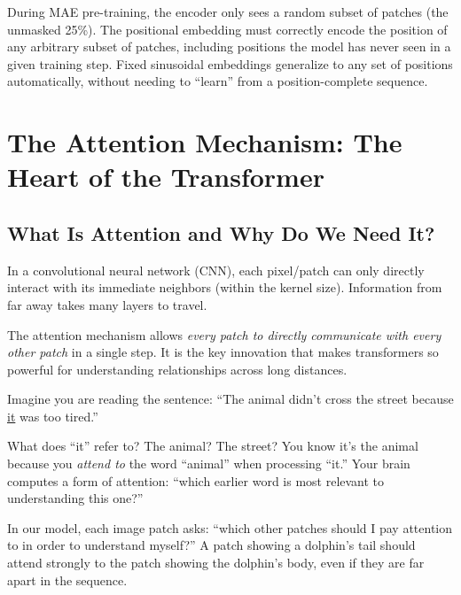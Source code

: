 \documentclass[12pt, a4paper]{report}
\begin{document}
\begin{conceptbox}
During MAE pre-training, the encoder only sees a random subset of patches (the unmasked 25\%). The positional embedding must correctly encode the position of any arbitrary subset of patches, including positions the model has never seen in a given training step. Fixed sinusoidal embeddings generalize to any set of positions automatically, without needing to ``learn'' from a position-complete sequence.
\end{conceptbox}

\chapter{The Attention Mechanism: The Heart of the Transformer}

\section{What Is Attention and Why Do We Need It?}

In a convolutional neural network (CNN), each pixel/patch can only directly interact with its immediate neighbors (within the kernel size). Information from far away takes many layers to travel.

The attention mechanism allows \emph{every patch to directly communicate with every other patch} in a single step. It is the key innovation that makes transformers so powerful for understanding relationships across long distances.

\begin{intuitionbox}
Imagine you are reading the sentence: ``The animal didn't cross the street because \underline{it} was too tired.''

What does ``it'' refer to? The animal? The street? You know it's the animal because you \emph{attend to} the word ``animal'' when processing ``it.'' Your brain computes a form of attention: ``which earlier word is most relevant to understanding this one?''

In our model, each image patch asks: ``which other patches should I pay attention to in order to understand myself?'' A patch showing a dolphin's tail should attend strongly to the patch showing the dolphin's body, even if they are far apart in the sequence.
\end{intuitionbox}
\end{document}
